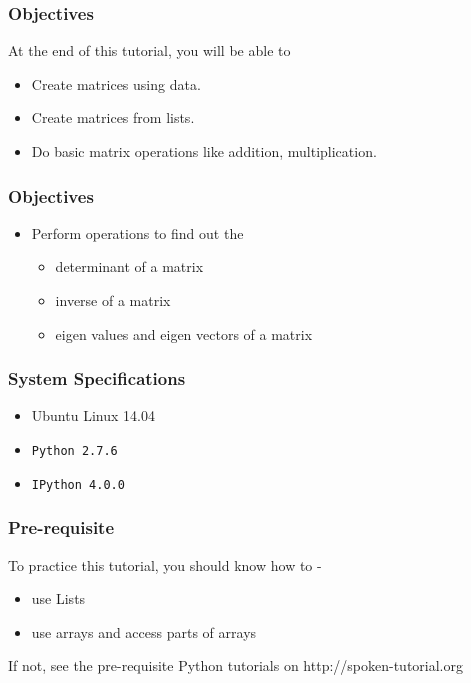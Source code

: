 \documentclass[17pt]{beamer}
\begin{document}
\begin{frame}
\frametitle{Objectives}
\label{sec-2}

  At the end of this tutorial, you will be able to \pause

\begin{itemize}
\item Create matrices using data.\pause
\item Create matrices from lists.\pause
\item Do basic matrix operations like addition, multiplication.
\end{itemize}
\end{frame}
\begin{frame}
\frametitle{Objectives}
\label{sec-2.2}
\begin{itemize}
\item Perform operations to find out the
\begin{itemize}
	\item determinant of a matrix\pause
	\item inverse of a matrix\pause
	\item eigen values and eigen vectors of a matrix
\end{itemize}
\end{itemize}
\end{frame}
\begin{frame}
\frametitle{System Specifications}\pause
\begin{itemize}
\item Ubuntu Linux 14.04\pause
\item \texttt{Python 2.7.6} \pause
\item \texttt{IPython 4.0.0}
\end{itemize}
\end{frame}
\begin{frame}
\frametitle{Pre-requisite}
\label{sec-3}

  To practice this tutorial, you should know how to -\pause

\begin{itemize}
\item use Lists\pause
\item use arrays and access parts of arrays\pause
\end{itemize}
If not, see the pre-requisite Python tutorials on {\color{blue}http://spoken-tutorial.org}
\end{frame}
\end{document}
